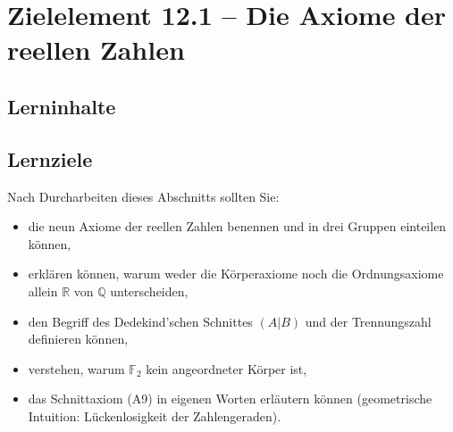 \documentclass[a4paper,12pt]{article}
\begin{document}
\newpage

\section*{Zielelement 12.1 -- Die Axiome der reellen Zahlen}

\subsection*{Lerninhalte}

\begin{center}
\end{center}

\subsection*{Lernziele}

Nach Durcharbeiten dieses Abschnitts sollten Sie:
\begin{itemize}
  \item die neun Axiome der reellen Zahlen benennen und in drei Gruppen einteilen können,
  \item erklären können, warum weder die Körperaxiome noch die Ordnungsaxiome allein $\mathbb{R}$
        von $\mathbb{Q}$ unterscheiden,
  \item den Begriff des Dedekind'schen Schnittes $(A|B)$ und der Trennungszahl definieren können,
  \item verstehen, warum $\mathbb{F}_2$ kein angeordneter Körper ist,
  \item das Schnittaxiom (A9) in eigenen Worten erläutern können (geometrische Intuition:
        Lückenlosigkeit der Zahlengeraden).
\end{itemize}
\end{document}

